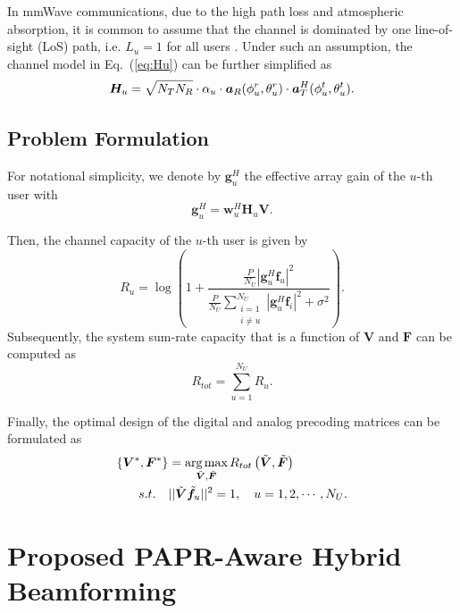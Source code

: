 \documentclass[conference]{IEEEtran}
\def\argmax{\mathop{\mbox{arg\,max}}}
\begin{document}
In mmWave communications, due to the high path loss and atmospheric absorption, it is common to assume that the channel is dominated by one line-of-sight (LoS) path, i.e. $L_u=1$ for all users \cite{alkhateeb2014channel}. Under such an assumption, the channel model in Eq.~(\ref{eq:Hu}) can be further simplified as
\begin{equation}{\label{eq:HuLu1}}
	\bm{H}_u = \sqrt{N_{T}N_{R}}\cdot\alpha_u \cdot\bm{a}_{R}(\phi^r_{u},\theta^r_{u})\cdot\bm{a}^{H}_{T}(\phi^t_{u},\theta^t_{u}).
\end{equation}

\subsection{Problem Formulation}
For notational simplicity, we denote by ${\bm{g}}_{u}^H$ the effective array gain of the $u$-th user with
\begin{equation}\label{eq:defgu}
{\bm{g}}_{u}^H = \bm{w}^H_u \bm{H}_u \bm{V}.
\end{equation}

Then, the channel capacity of the $u$-th user is given by
\begin{equation}\label{eq:6}
	R_u = \log\left(1+\frac{\frac{P}{N_U}|{\bm{g}}_{u}^H \bm{f}_u|^2}{\frac{P}{N_U}\displaystyle\sum_{\substack{i=1 \\ i\neq u}}^{N_U}|{\bm{g}}_{u}^H\bm{f}_i|^2+\sigma^2}\right).
\end{equation}
Subsequently, the system sum-rate capacity that is a function of ${\bm V}$ and ${\bm F}$ can be computed as
\begin{equation}
R_{tot}=\sum_{u=1}^{N_U}R_u.
\end{equation}

Finally, the optimal design of the digital and analog precoding matrices can be formulated as
\begin{align}\label{eq:maxsumrate}
\left\{{\bm V}^*,{\bm F}^*\right\} &= \argmax_{\tilde{\bm V},\tilde{\bm F}} R_{tot}\left(\tilde{\bm V},\tilde{\bm F}\right)\\ \nonumber
s.t. \quad&||\tilde{\bm V}\tilde{\bm f}_u||^2 = 1, \quad u=1,2,\cdots,N_U.
\end{align}

\section{Proposed PAPR-Aware Hybrid Beamforming}
\end{document}
